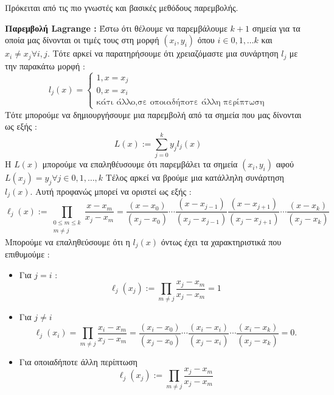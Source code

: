 Πρόκειται από τις πιο γνωστές και βασικές μεθόδους παρεμβολής. 
\begin{definition}
\textbf{Παρεμβολή Lagrange :}
Έστω ότι θέλουμε να παρεμβάλουμε $k+1$ σημεία για τα οποία μας δίνονται οι τιμές τους στη μορφή $\left(x_{i}, y_{i}\right)$ όπου $i \in 0, 1, \dots k$ και $x_i \ne x_j \forall i, j$. Τότε αρκεί να παρατηρήσουμε ότι χρειαζόμαστε μια συνάρτηση $l_j$ με την παρακάτω μορφή :
$$
l_{j}(x) =\begin{cases}1, x=x_j\\ 0, x = x_i\\ \text{κάτι άλλο}, \text{σε οποιαδήποτε άλλη περίπτωση}\end{cases}
$$
Τότε μπορούμε να δημιουργήσουμε μια παρεμβολή από τα σημεία που μας δίνονται ως εξής :
$$
L(x):=\sum_{j=0}^{k} y_{j} l_{j}(x)
$$
Η $L(x)$ μπορούμε να επαληθέυσουμε ότι παρεμβάλει τα σημεία $(x_i, y_i)$ αφού $L(x_j)=y_j \forall j \in 0, 1, \dots, k$
Τέλος αρκεί να βρούμε μια κατάλληλη συνάρτηση $l_j(x)$. Αυτή προφανώς μπορεί να οριστεί ως εξής :
$$
\ell_{j}(x):=\prod_{\substack{0 \leq m \leq k \\ m \neq j}} \frac{x-x_{m}}{x_{j}-x_{m}}=\frac{\left(x-x_{0}\right)}{\left(x_{j}-x_{0}\right)} \cdots \frac{\left(x-x_{j-1}\right)}{\left(x_{j}-x_{j-1}\right)} \frac{\left(x-x_{j+1}\right)}{\left(x_{j}-x_{j+1}\right)} \cdots \frac{\left(x-x_{k}\right)}{\left(x_{j}-x_{k}\right)}
$$
Μπορούμε να επαληθεύσουμε ότι η $l_j(x)$ όντως έχει τα χαρακτηριστικά που επιθυμούμε : 
\begin{itemize}
    \item Για $j=i$ : 
    $$
        \ell_{j}\left(x_{j}\right):=\prod_{m \neq j} \frac{x_{j}-x_{m}}{x_{j}-x_{m}}=1
    $$
    \item Για $j \ne i$
    $$
        \ell_{j}\left(x_{i}\right)=\prod_{m \neq j} \frac{x_{i}-x_{m}}{x_{j}-x_{m}}=\frac{\left(x_{i}-x_{0}\right)}{\left(x_{j}-x_{0}\right)} \cdots     \frac{\left(x_{i}-x_{i}\right)}{\left(x_{j}-x_{i}\right)} \cdots \frac{\left(x_{i}-x_{k}\right)}{\left(x_{j}-x_{k}\right)}=0 .
    $$
    \item Για οποιαδήποτε άλλη περίπτωση
    $$
        \ell_{j}\left(x_{j}\right):=\prod_{m \neq j} \frac{x_{j}-x_{m}}{x_{j}-x_{m}}
    $$
\end{itemize}

\end{definition}